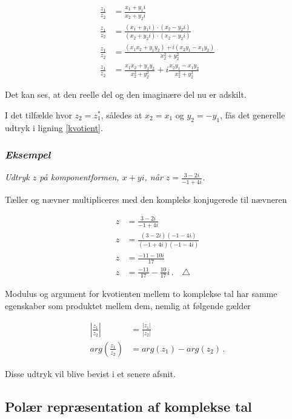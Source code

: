 \documentclass[a4paper, 12pt,titlepage]{article}
\begin{document}
\begin{align*}
    \frac{z_1}{z_2} &= \frac{x_1+y_1 i}{x_2+y_2 i} \\
    \frac{z_1}{z_2} &= \frac{(x_1+y_1 i)\cdot(x_2-y_2 i)}{(x_2+y_2 i)\cdot(x_2-y_2 i)} \\
    \frac{z_1}{z_2} &= \frac{(x_1 x_2 + y_1 y_2)+i(x_2 y_1 - x_1 y_2)}{x_2^2+y_2^2} \\
    \frac{z_1}{z_2} &= \frac{x_1 x_2 + y_1 y_2}{x_2^2+y_2^2}+i\frac{x_2 y_1 - x_1 y_2}{x_2^2+y_2^2} 
\end{align*}

Det kan ses, at den reelle del og den imaginære del nu er adskilt.

I det tilfælde hvor \(z_2=z_1^*\), således at \(x_2=x_1\) og \(y_2=- y_1\), fås det generelle udtryk i ligning \eqref{kvotient}.

\subsubsection*{\emph{Eksempel}}
\label{sec:org500bf06}
\emph{Udtryk \(z\) på komponentformen, \(x+yi\), når \(z=\frac{3-2i}{-1+4i}\).}

Tæller og nævner multipliceres med den kompleks konjugerede til nævneren

\begin{align*}
    z &=\frac{3-2i}{-1+4i} \\
    z &=\frac{(3-2i)(-1-4i)}{(-1+4i)(-1-4i)} \\
    z &=\frac{-11 -10i}{17} \\
    z &=\frac{-11}{17} -\frac{10}{17}i \, . \quad \triangle
\end{align*}

Modulus og argument for kvotienten mellem to komplekse tal har samme egenskaber som produktet mellem dem, nemlig at følgende gælder

\begin{align}
    \left\lvert\frac{z_1}{z_2}\right\rvert &= \frac{\lvert z_1 \rvert}{\lvert z_2 \rvert} \\
    arg\left( \frac{z_1}{z_2} \right) &= arg(z_1) - arg(z_2) \,.
\end{align}

Disse udtryk vil blive bevist i et senere afsnit.

\subsection{Polær repræsentation af komplekse tal}
\label{sec:org9ae9365}
\end{document}
